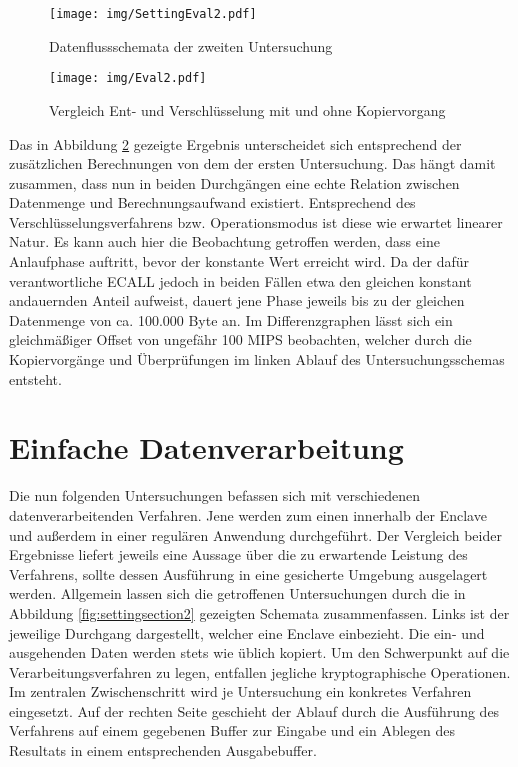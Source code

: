 \begin{figure}[h]
	\texttt{[image: img/SettingEval2.pdf]}
	\centering
	\caption{Datenflussschemata der zweiten Untersuchung}
	\label{fig:settingeval2}
\end{figure}

\begin{figure}[h]
	\texttt{[image: img/Eval2.pdf]}
	\centering
	\caption{Vergleich Ent- und Verschlüsselung mit und ohne Kopiervorgang}
	\label{fig:eval2}
\end{figure}

Das in Abbildung \ref{fig:eval2} gezeigte Ergebnis unterscheidet sich entsprechend der zusätzlichen Berechnungen von dem der ersten Untersuchung. Das hängt damit zusammen, dass nun in beiden Durchgängen eine echte Relation zwischen Datenmenge und Berechnungsaufwand existiert. Entsprechend des Verschlüsselungsverfahrens bzw. Operationsmodus ist diese wie erwartet linearer Natur. Es kann auch hier die Beobachtung getroffen werden, dass eine Anlaufphase auftritt, bevor der konstante Wert erreicht wird. Da der dafür verantwortliche \ac{ECALL} jedoch in beiden Fällen etwa den gleichen konstant andauernden Anteil aufweist, dauert jene Phase jeweils bis zu der gleichen Datenmenge von ca. 100.000 Byte an. Im Differenzgraphen lässt sich ein gleichmäßiger Offset von ungefähr 100 \ac{MIPS} beobachten, welcher durch die Kopiervorgänge und Überprüfungen im linken Ablauf des Untersuchungsschemas entsteht.

\section{Einfache Datenverarbeitung}

Die nun folgenden Untersuchungen befassen sich mit verschiedenen datenverarbeitenden Verfahren. Jene werden zum einen innerhalb der Enclave und außerdem in einer regulären Anwendung durchgeführt. Der Vergleich beider Ergebnisse liefert jeweils eine Aussage über die zu erwartende Leistung des Verfahrens, sollte dessen Ausführung in eine gesicherte Umgebung ausgelagert werden. Allgemein lassen sich die getroffenen Untersuchungen durch die in Abbildung \ref{fig:settingsection2} gezeigten Schemata zusammenfassen. Links ist der jeweilige Durchgang dargestellt, welcher eine Enclave einbezieht. Die ein- und ausgehenden Daten werden stets wie üblich kopiert. Um den Schwerpunkt auf die Verarbeitungsverfahren zu legen, entfallen jegliche kryptographische Operationen. Im zentralen Zwischenschritt wird je Untersuchung ein konkretes Verfahren eingesetzt. Auf der rechten Seite geschieht der Ablauf durch die Ausführung des Verfahrens auf einem gegebenen Buffer zur Eingabe und ein Ablegen des Resultats in einem entsprechenden Ausgabebuffer.

